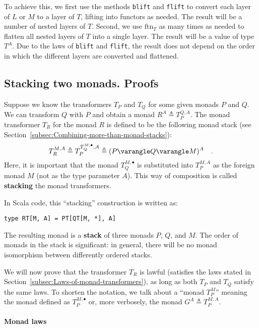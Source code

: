 To achieve this, we first use the methods \lstinline!blift! and \lstinline!flift!
to convert each layer of $L$ or $M$ to a layer of $T$, lifting
into functors as needed. The result will be a number of nested layers
of $T$. Second, we use $\text{ftn}_{T}$ as many times as needed
to flatten all nested layers of $T$ into a single layer. The result
will be a value of type $T^{A}$. Due to the laws of \lstinline!blift!
and \lstinline!flift!, the result does not depend on the order in
which the different layers are converted and flattened.

\subsection{Stacking two monads. Proofs\label{subsec:Stacking-two-monads}}

Suppose we know the transformers $T_{P}$ and $T_{Q}$ for some given
monads $P$ and $Q$. We can transform $Q$ with $P$ and obtain a
monad $R^{A}\triangleq T_{P}^{Q,A}$. The monad transformer $T_{R}$
for the monad $R$ is defined to be the following monad stack (see
Section~\ref{subsec:Combining-more-than-monad-stacks}):
\[
T_{R}^{M,A}\triangleq T_{P}^{T_{Q}^{M,\bullet},A}\triangleq(P\varangle Q\varangle M)^{A}\quad.
\]
Here, it is important that the monad $T_{Q}^{M,\bullet}$ is substituted
into $T_{P}^{M,A}$ as the foreign monad $M$ (not as the type parameter
$A$). This way of composition is called \textbf{stacking}
the monad transformers. 

In Scala code, this \textsf{``}stacking\textsf{''} construction is written as:
\begin{lstlisting}
type RT[M, A] = PT[QT[M, *], A]
\end{lstlisting}
The resulting monad is a \textbf{stack} of
three monads $P$, $Q$, and $M$. The order of monads in the stack
is significant: in general, there will be no monad isomorphism between
differently ordered stacks.

We will now prove that the transformer $T_{R}$ is lawful (satisfies
the laws stated in Section~\ref{subsec:Laws-of-monad-transformers}),
as long as both $T_{P}$ and $T_{Q}$ satisfy the same laws. To shorten
the notation, we talk about a \textsf{``}monad $T_{P}^{M}$\textsf{''} meaning the
monad defined as $T_{P}^{M,\bullet}$ or, more verbosely, the monad
$G^{A}\triangleq T_{P}^{M,A}$.

\paragraph{Monad laws}

